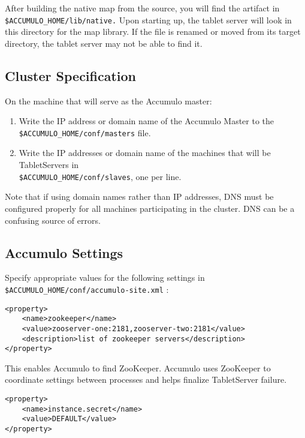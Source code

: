 After building the native map from the source, you will find the artifact in
\texttt{\$ACCUMULO\_HOME/lib/native.} Upon starting up, the tablet server will look
in this directory for the map library. If the file is renamed or moved from its
target directory, the tablet server may not be able to find it.

\subsection{Cluster Specification}

On the machine that will serve as the Accumulo master:

\begin{enumerate}
\item{Write the IP address or domain name of the Accumulo Master to the\\\texttt{\$ACCUMULO\_HOME/conf/masters} file.}
\item{Write the IP addresses or domain name of the machines that will be TabletServers in\\\texttt{\$ACCUMULO\_HOME/conf/slaves}, one per line.}
\end{enumerate}

Note that if using domain names rather than IP addresses, DNS must be configured
properly for all machines participating in the cluster. DNS can be a confusing source
of errors.

\subsection{Accumulo Settings}
Specify appropriate values for the following settings in\\
\texttt{\$ACCUMULO\_HOME/conf/accumulo-site.xml} :

\small
\begin{verbatim}
<property>
    <name>zookeeper</name>
    <value>zooserver-one:2181,zooserver-two:2181</value>
    <description>list of zookeeper servers</description>
</property>
\end{verbatim}
\normalsize

This enables Accumulo to find ZooKeeper. Accumulo uses ZooKeeper to coordinate
settings between processes and helps finalize TabletServer failure.


\small
\begin{verbatim}
<property>
    <name>instance.secret</name>
    <value>DEFAULT</value>
</property>
\end{verbatim}
\normalsize

